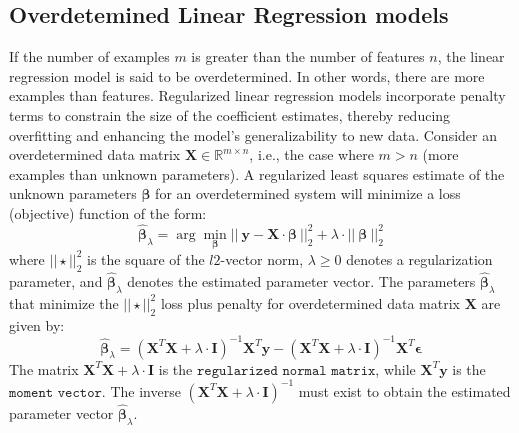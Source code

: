 \documentclass{article}[11pt]
\begin{document}
\subsection{Overdetemined Linear Regression models}
If the number of examples $m$ is greater than the number of features $n$, the linear regression model is said to be overdetermined.
In other words, there are more examples than features.  Regularized linear regression models incorporate penalty terms to constrain the size of the coefficient estimates, thereby reducing overfitting and enhancing the model's generalizability to new data. 
Consider an overdetermined data matrix $\mathbf{X}\in\mathbb{R}^{m\times{n}}$, i.e., the case where $m>n$ (more examples than unknown parameters).
A regularized least squares estimate of the unknown parameters $\mathbf{\beta}$ for an overdetermined system will minimize a loss (objective) function of the form:
\begin{equation*}
\hat{\mathbf{\beta}}_{\lambda} = \arg\min_{\mathbf{\beta}} ||~\mathbf{y} - \mathbf{X}\cdot\mathbf{\beta}~||^{2}_{2} + \lambda\cdot||~\mathbf{\beta}~||^{2}_{2}
\end{equation*}
where $||\star||^{2}_{2}$ is the square of the $l2$-vector norm, $\lambda\geq{0}$ denotes a regularization parameter, and $\hat{\mathbf{\beta}}_{\lambda}$ denotes the estimated parameter vector. 
The parameters $\hat{\mathbf{\beta}}_{\lambda}$ that minimize the $||\star||^{2}_{2}$ loss plus penalty for overdetermined data matrix $\mathbf{X}$ are given by:
\begin{equation*}
\hat{\mathbf{\beta}}_{\lambda} = \left(\mathbf{X}^{T}\mathbf{X}+\lambda\cdot\mathbf{I}\right)^{-1}\mathbf{X}^{T}\mathbf{y} - \left(\mathbf{X}^{T}\mathbf{X}+\lambda\cdot\mathbf{I}\right)^{-1}\mathbf{X}^{T}\mathbf{\epsilon}
\end{equation*}
The matrix $\mathbf{X}^{T}\mathbf{X}+\lambda\cdot\mathbf{I}$ is the $\texttt{regularized normal matrix}$, while $\mathbf{X}^{T}\mathbf{y}$ is the $\texttt{moment vector}$. 
The inverse $\left(\mathbf{X}^{T}\mathbf{X}+\lambda\cdot\mathbf{I}\right)^{-1}$ must exist to obtain the estimated parameter vector $\hat{\mathbf{\beta}}_{\lambda}$.
\end{document}
